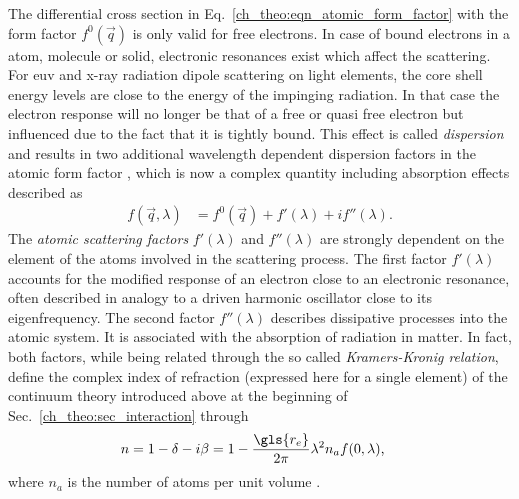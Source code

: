 The differential cross section in Eq.~\eqref{ch_theo:eqn_atomic_form_factor} with the form factor $f^{0}(\vec{q})$ is only valid for free electrons. In case of bound electrons in a atom, molecule or solid, electronic resonances exist which affect the scattering. For \gls{euv} and x-ray radiation dipole scattering on light elements, the core shell energy levels are close to the energy of the impinging radiation. In that case the electron response will no longer be that of a free or quasi free electron but influenced due to the fact that it is tightly bound. This effect is called \emph{dispersion} and results in two additional wavelength dependent dispersion factors in the atomic form factor \cite{als-nielsen_x-rays_2011, daillant_x-ray_2009}, which is now a complex quantity including absorption effects described as
\begin{align}
 f(\vec{q}, \lambda) &= f^0(\vec{q}) + f'(\lambda) + i f''(\lambda) \text{.} \label{ch_theo:eqn_dispersion_correction}
\end{align}
The \emph{atomic scattering factors} $f'(\lambda)$ and $f''(\lambda)$ are strongly dependent on the element of the atoms involved in the scattering process. The first factor $f'(\lambda)$ accounts for the modified response of an electron close to an electronic resonance, often described in analogy to a driven harmonic oscillator close to its eigenfrequency. The second factor $f''(\lambda)$ describes dissipative processes into the atomic system. It is associated with the absorption of radiation in matter. In fact, both factors, while being related through the so called \emph{Kramers-Kronig relation}, define the complex index of refraction (expressed here for a single element) of the continuum theory introduced above at the beginning of Sec.~\ref{ch_theo:sec_interaction} through
\begin{align}
n &= 1 - \delta - i \beta = 1 - \frac{\gls{r_e}}{2 \pi} \lambda^2 n_a f(0, \lambda) \text{,}
\end{align}
where $n_a$ is the number of atoms per unit volume \cite{thompson_x-ray_2001}.

